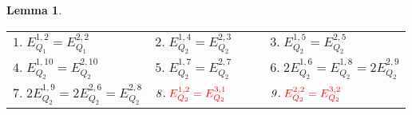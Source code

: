\documentclass[sn-mathphys, Numbered ,a4paper]{sn-jnl}%
\theoremstyle{plain}
\newtheorem{lemma}[theorem]{Lemma}
\theoremstyle{definition}
\theoremstyle{remark}
\theoremstyle{plain}
\theoremstyle{definition}
\theoremstyle{remark}
\begin{document}
\begin{lemma}
{\renewcommand{\arraystretch}{1.5}
	\begin{tabular}[t]{lll}
		 $\mathit{1.}\; E_{Q_1}^{1,2} = E_{Q_1}^{2,2}$\quad\quad& 
		 $\mathit{2.}\; E_{Q_2}^{1,4} = E_{Q_2}^{2,3}$\quad\quad&
		 $\mathit{3.}\; E_{Q_2}^{1,5} = E_{Q_2}^{2,5}$ \quad\quad\\
		 $\mathit{4.}\; E_{Q_2}^{1,10} = E_{Q_2}^{2,10}$\quad\quad&
		 $\mathit{5.}\; E_{Q_2}^{1,7} = E_{Q_2}^{2,7}\quad\quad$&
		 $\mathit{6.}\; 2E_{Q_2}^{1,6} = E_{Q_2}^{1,8}= 2E_{Q_2}^{2,9}$\quad\quad\\
		 $\mathit{7.}\; 2E_{Q_2}^{1,9} = 2E_{Q_2}^{2,6}= E_{Q_2}^{2,8}$\quad\quad&
		 $\mathit{8.}\; \textcolor{red}{E_{Q_2}^{1,2} = E_{Q_2}^{3,1}}$\quad\quad&
		 $\mathit{9.}\; \textcolor{red}{E_{Q_2}^{2,2} = E_{Q_2}^{3,2}}$\quad\quad 
\end{tabular}}
\end{lemma}	 
\end{document}
